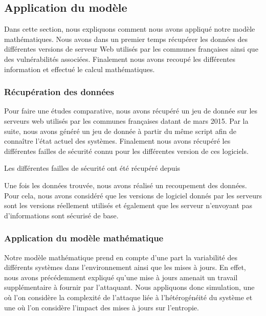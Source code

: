 \subsection{Application du modèle}
Dans cette section, nous expliquons comment nous avons appliqué notre modèle mathématiques.
Nous avons dans un premier temps récupérer les données des différentes versions de serveur Web utilisés par les communes françaises ainsi que des vulnérabilités associées.
Finalement nous avons recoupé les différentes information et effectué le calcul mathématiques.

\subsubsection{Récupération des données}
Pour faire une études comparative, nous avons récupéré un jeu de donnée sur les serveurs web utilisés par les communes françaises datant de mars 2015.
Par la suite, nous avons généré un jeu de donnée à partir du même script afin de connaître l'état actuel des systèmes.
Finalement nous avons récupéré les différentes failles de sécurité connu pour les différentes version de ces logiciels.

Les différentes failles de sécurité ont été récupéré depuis~\cite{vulnDatabase}

Une fois les données trouvée, nous avons réalisé un recoupement des données.
Pour cela, nous avons considéré que les versions de logiciel donnés par les serveurs sont les versions réellement utilisés et également que les serveur n'envoyant pas d'informations sont sécurisé de base.


\subsubsection{Application du modèle mathématique}
Notre modèle mathématique prend en compte d'une part la variabilité des différents systèmes dans l'environnement ainsi que les mises à jours.
En effet, nous avons précédemment expliqué qu'une mise à jours amenait un travail supplémentaire à fournir par l'attaquant.
Nous appliquons donc simulation, une où l'on considère la complexité de l'attaque liée à l'hétérogénéité du système et une où l'on considère l'impact des mises à jours sur l'entropie.

